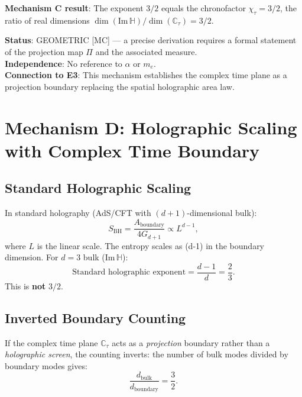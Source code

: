 \documentclass[12pt,a4paper]{article}
\theoremstyle{definition}
\theoremstyle{remark}
\begin{document}
\begin{resultbox}
\textbf{Mechanism C result}: The exponent $3/2$ equals the chronofactor
$\chi_\tau = 3/2$, the ratio of real dimensions
$\dim(\mathrm{Im}\,\mathbb{H}) / \dim(\mathbb{C}_\tau) = 3/2$.

\medskip
\textbf{Status}: GEOMETRIC [MC] — a precise derivation requires a formal statement
of the projection map $\Pi$ and the associated measure.\\
\textbf{Independence}: No reference to $\alpha$ or $m_e$.\\
\textbf{Connection to E3}: This mechanism establishes the complex time plane as
a projection boundary replacing the spatial holographic area law.
\end{resultbox}

\section{Mechanism D: Holographic Scaling with Complex Time Boundary}
\label{sec:exp32:holographic}

\subsection{Standard Holographic Scaling}
\label{ssec:exp32:holo:standard}

In standard holography (AdS/CFT with $(d+1)$-dimensional bulk):
\begin{equation}
  S_{\mathrm{BH}} = \frac{A_{\mathrm{boundary}}}{4G_{d+1}} \propto L^{d-1},
  \label{eq:exp32:BH_entropy}
\end{equation}
where $L$ is the linear scale.  The entropy scales as (d-1) in the boundary
dimension.  For $d=3$ bulk (Im$\,\mathbb{H}$):
\begin{equation}
  \text{Standard holographic exponent} = \frac{d-1}{d} = \frac{2}{3}.
  \label{eq:exp32:holo_standard}
\end{equation}
This is \textbf{not} $3/2$.

\subsection{Inverted Boundary Counting}
\label{ssec:exp32:holo:inverted}

If the complex time plane $\mathbb{C}_\tau$ acts as a \emph{projection} boundary
rather than a \emph{holographic screen}, the counting inverts: the number of
bulk modes divided by boundary modes gives:
\begin{equation}
  \frac{d_{\mathrm{bulk}}}{d_{\mathrm{boundary}}} = \frac{3}{2}.
  \label{eq:exp32:holo_inverted}
\end{equation}
\end{document}
